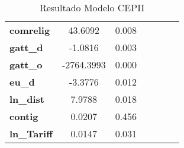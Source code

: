 \begin{table}[ht]
\begin{center}
\begin{tabular}{lcccccc}
\textbf{comrelig}                                                  &      43.6092 &        0.008       \\
\textbf{gatt\_d}                                                   &      -1.0816 &        0.003       \\
\textbf{gatt\_o}                                                   &   -2764.3993 &        0.000       \\
\textbf{eu\_d}                                                     &      -3.3776 &        0.012       \\
\textbf{ln\_dist}                                                  &       7.9788 &        0.018       \\
\textbf{contig}                                                    &       0.0207 &        0.456       \\
\textbf{ln\_Tariff}                                                &       0.0147 &        0.031       \\
\bottomrule
\end{tabular}
\end{center}
\caption{Resultado Modelo CEPII}
\end{table}